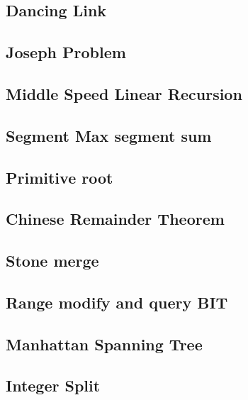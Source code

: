 \documentclass[a4paper,10pt,twocolumn,oneside]{article}
\begin{document}
\subsection{Dancing Link}


\subsection{Joseph Problem}


\subsection{Middle Speed Linear Recursion}


\subsection{Segment Max segment sum}


\subsection{Primitive root}


\subsection{Chinese Remainder Theorem}


\subsection{Stone merge}


\subsection{Range modify and query BIT}


\subsection{Manhattan Spanning Tree}


\subsection{Integer Split}

\end{document}
